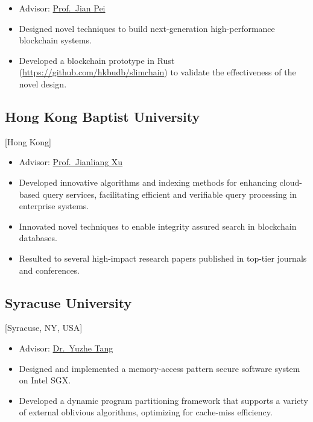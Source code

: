 \documentclass{mycv}
\begin{document}
\begin{itemize}
  \item Advisor: \href{https://sites.google.com/view/jpei/jian-peis-homepage}{Prof.~Jian Pei}
  \item Designed novel techniques to build next-generation high-performance blockchain systems.
  \item Developed a blockchain prototype in Rust (\url{https://github.com/hkbudb/slimchain}) to validate the effectiveness of the novel design.
\end{itemize}

\subsection{Hong Kong Baptist University}[Hong Kong]
\begin{positions}
\end{positions}

\begin{itemize}
  \item Advisor: \href{https://www.comp.hkbu.edu.hk/~xujl}{Prof.~Jianliang Xu}
  \item Developed innovative algorithms and indexing methods for enhancing cloud-based query services, facilitating efficient and verifiable query processing in enterprise systems.
  \item Innovated novel techniques to enable integrity assured search in blockchain databases.
  \item Resulted to several high-impact research papers published in top-tier journals and conferences.
\end{itemize}

\subsection{Syracuse University}[Syracuse, NY, USA]
\begin{positions}
\end{positions}

\begin{itemize}
  \item Advisor: \href{https://tristartom.github.io}{Dr.~Yuzhe Tang}
  \item Designed and implemented a memory-access pattern secure software system on Intel SGX\@.
  \item Developed a dynamic program partitioning framework that supports a variety of external oblivious algorithms, optimizing for cache-miss efficiency.
\end{itemize}
\end{document}
